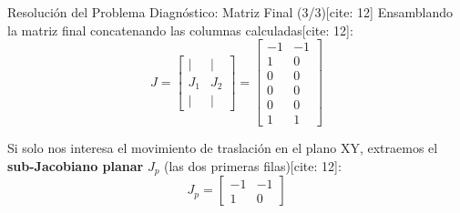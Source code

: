 \documentclass[aspectratio=169, xcolor={table,xcdraw}]{beamer}
\begin{document}
\begin{frame}{Resolución del Problema Diagnóstico: Matriz Final (3/3)[cite: 12]}
    Ensamblando la matriz final concatenando las columnas calculadas[cite: 12]:
    \begin{equation*}
        \boxed{ J = \begin{bmatrix} | & | \\ J_1 & J_2 \\ | & | \end{bmatrix} = \begin{bmatrix} -1 & -1 \\ 1 & 0 \\ 0 & 0 \\ 0 & 0 \\ 0 & 0 \\ 1 & 1 \end{bmatrix} } 
    \end{equation*}

    \vspace{0.4cm}
    Si solo nos interesa el movimiento de traslación en el plano XY, extraemos el \textbf{sub-Jacobiano planar} $J_p$ (las dos primeras filas)[cite: 12]:
    \begin{equation*}
        \boxed{ J_p = \begin{bmatrix} -1 & -1 \\ 1 & 0 \end{bmatrix} }
    \end{equation*}
\end{frame}
\end{document}
